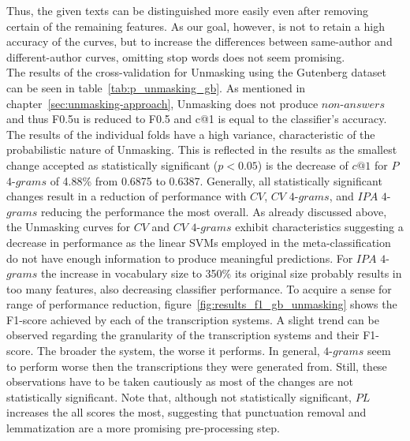 Thus, the given texts can be distinguished more easily even after removing certain of the remaining features.
As our goal, however, is not to retain a high accuracy of the curves, but to increase the differences between same-author and different-author curves, omitting stop words does not seem promising.\\
The results of the cross-validation for Unmasking using the Gutenberg dataset can be seen in table~\ref{tab:p_unmasking_gb}.
As mentioned in chapter~\ref{sec:unmasking-approach}, Unmasking does not produce $non$-$answers$ and thus F0.5u is reduced to F0.5 and c@1 is equal to the classifier's accuracy.
The results of the individual folds have a high variance, characteristic of the probabilistic nature of Unmasking.
This is reflected in the results as the smallest change accepted as statistically significant ($p<0.05$) is the decrease of $c@1$ for $P$ $4$-$grams$ of 4.88\% from 0.6875 to 0.6387.
Generally, all statistically significant changes result in a reduction of performance with $CV$, $CV$ $4$-$grams$, and $IPA$ $4$-$grams$ reducing the performance the most overall.
As already discussed above, the Unmasking curves for $CV$ and $CV$ $4$-$grams$ exhibit characteristics suggesting a decrease in performance as the linear SVMs employed in the meta-classification do not have enough information to produce meaningful predictions.
For $IPA$ $4$-$grams$ the increase in vocabulary size to 350\% its original size probably results in too many features, also decreasing classifier performance.
To acquire a sense for range of performance reduction, figure~\ref{fig:results_f1_gb_unmasking} shows the F1-score achieved by each of the transcription systems.
A slight trend can be observed regarding the granularity of the transcription systems and their F1-score.
The broader the system, the worse it performs.
In general, $4$-$grams$ seem to perform worse then the transcriptions they were generated from.
Still, these observations have to be taken cautiously as most of the changes are not statistically significant.
Note that, although not statistically significant, $PL$ increases the all scores the most, suggesting that punctuation removal and lemmatization are a more promising pre-processing step.\\

